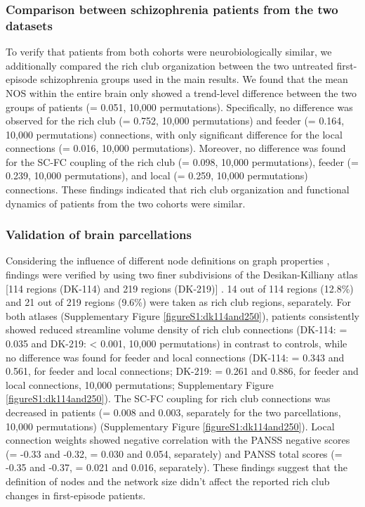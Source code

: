 \begin{refsection}
\subsubsection{Comparison between schizophrenia patients from the two datasets}
To verify that patients from both cohorts were neurobiologically similar, we additionally compared the rich club organization between the two untreated first-episode schizophrenia groups used in the main results. We found that the mean NOS within the entire brain only showed a trend-level difference between the two groups of patients (\pval = 0.051, 10,000 permutations). Specifically, no difference was observed for the rich club (\pval = 0.752, 10,000 permutations) and feeder (\pval = 0.164, 10,000 permutations) connections, with only significant difference for the local connections (\pval = 0.016, 10,000 permutations). Moreover, no difference was found for the SC-FC coupling of the rich club (\pval = 0.098, 10,000 permutations), feeder (\pval = 0.239, 10,000 permutations), and local (\pval = 0.259, 10,000 permutations) connections. These findings indicated that rich club organization and functional dynamics of patients from the two cohorts were similar.

\subsubsection*{Validation of brain parcellations}
Considering the influence of different node definitions on graph properties \citep{Fornito2010NetworkSE}, findings were verified by using two finer subdivisions of the Desikan-Killiany atlas [114 regions (DK-114) and 219 regions (DK-219)] \citep{CAMMOUN2012386}. 14 out of 114 regions (12.8\%) and 21 out of 219 regions (9.6\%) were taken as rich club regions, separately. For both atlases (Supplementary Figure \ref{figureS1:dk114and250}), patients consistently showed reduced streamline volume density of rich club connections (DK-114: \pval = 0.035 and DK-219: \pval < 0.001, 10,000 permutations) in contrast to controls, while no difference was found for feeder and local connections (DK-114: \pval = 0.343 and 0.561, for feeder and local connections; DK-219: \pval = 0.261 and 0.886, for feeder and local connections, 10,000 permutations; Supplementary Figure \ref{figureS1:dk114and250}). The SC-FC coupling for rich club connections was decreased in patients (\pval = 0.008 and 0.003, separately for the two parcellations, 10,000 permutations) (Supplementary Figure \ref{figureS1:dk114and250}). Local connection weights showed negative correlation with the PANSS negative scores (\rval = -0.33 and -0.32, \pval = 0.030 and 0.054, separately) and PANSS total scores (\rval = -0.35 and -0.37, \pval = 0.021 and 0.016, separately). These findings suggest that the definition of nodes and the network size didn't affect the reported rich club changes in first-episode patients.


\end{refsection}
